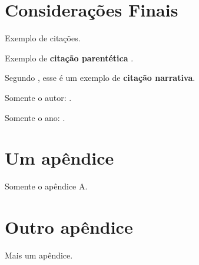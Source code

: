 \documentclass[12pt]{article}
\begin{document}
\section{Considerações Finais}\label{sec:finais}

Exemplo de citações.

Exemplo de \textbf{citação parentética} \cite{Teste2025}.

Segundo , esse é um exemplo de \textbf{citação narrativa}.

Somente o autor: \citeauthor{Teste2025}.

Somente o ano: \citeyear{Teste2025}.

% 



% 

\appendix
\renewcommand{\thesection}{Apêndice \Alph{section}}

\section{Um apêndice}\label{sec:apendA}

Somente o apêndice A.

\section{Outro apêndice}\label{sec:apendB}

Mais um apêndice.
\end{document}
